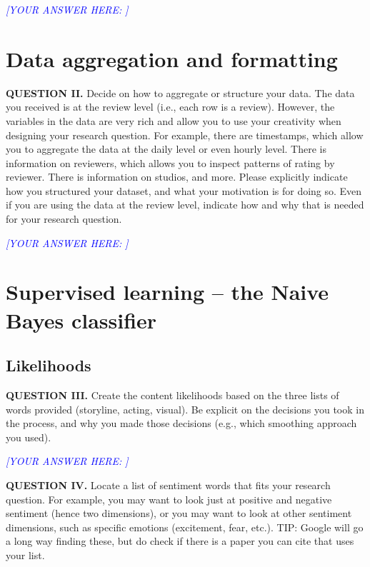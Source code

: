 \documentclass[11pt]{article}
\newcommand{\question}[2]{%
  \par\medskip
  \noindent\textbf{QUESTION #1.} #2\par\medskip
}
\newcommand{\answer}[1]{%
  \textcolor{blue}{\emph{[YOUR ANSWER HERE: #1]}}
}
\begin{document}
\answer{}

\section{Data aggregation and formatting}
\question{II}{Decide on how to aggregate or structure your data. The data you
received is at the review level (i.e., each row is a review). However, the variables
in the data are very rich and allow you to use your creativity when designing your
research question. For example, there are timestamps, which allow you to aggregate
the data at the daily level or even hourly level. There is information on reviewers,
which allows you to inspect patterns of rating by reviewer. There is information on
studios, and more. Please explicitly indicate how you structured your dataset, and
what your motivation is for doing so. Even if you are using the data at the review
level, indicate how and why that is needed for your research question.}

\answer{}

\section{Supervised learning -- the Naive Bayes classifier}

\subsection{Likelihoods}
\question{III}{Create the content likelihoods based on the three lists of words
provided (storyline, acting, visual). Be explicit on the decisions you took in the
process, and why you made those decisions (e.g., which smoothing approach you used).}

\answer{}

\question{IV}{Locate a list of sentiment words that fits your research question. For
example, you may want to look just at positive and negative sentiment (hence two
dimensions), or you may want to look at other sentiment dimensions, such as specific
emotions (excitement, fear, etc.). TIP: Google will go a long way finding these, but
do check if there is a paper you can cite that uses your list.}
\end{document}
